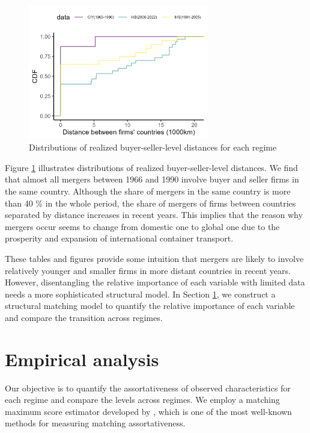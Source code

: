 \documentclass[10pt]{article}
\begin{document}
\begin{figure}[!ht]
\begin{center}
  \includegraphics[width = 0.7\textwidth]
  {figuretable/distance_cdf.png}
  \caption{Distributions of realized buyer-seller-level distances for each regime}
  \label{fg:distance_cdf}
  \end{center}
\footnotesize
\end{figure}


Figure \ref{fg:distance_cdf} illustrates distributions of realized buyer-seller-level distances. 
We find that almost all mergers between 1966 and 1990 involve buyer and seller firms in the same country. 
Although the share of mergers in the same country is more than 40 \% in the whole period, the share of mergers of firms between countries separated by distance increases in recent years. 
This implies that the reason why mergers occur seems to change from domestic one to global one due to the prosperity and expansion of international container transport.

These tables and figures provide some intuition that mergers are likely to involve relatively younger and smaller firms in more distant countries in recent years. 
However, disentangling the relative importance of each variable with limited data needs a more sophisticated structural model.
In Section \ref{sec:empirical_analysis}, we construct a structural matching model to quantify the relative importance of each variable and compare the transition across regimes.




\section{Empirical analysis}\label{sec:empirical_analysis}

Our objective is to quantify the assortativeness of observed characteristics  for each regime and compare the levels across regimes. 
We employ a matching maximum score estimator developed by \cite{fox2018qe}, which is one of the most well-known methods for measuring matching assortativeness.
\end{document}
